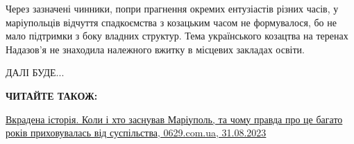 Через зазначені чинники, попри прагнення окремих ентузіастів різних часів, у
маріупольців відчуття спадкоємства з козацьким часом не формувалося, бо не мало
підтримки з боку владних структур. Тема українського козацтва на теренах
Надазов'я не знаходила належного вжитку в місцевих закладах освіти.

ДАЛІ БУДЕ...

\textbf{ЧИТАЙТЕ ТАКОЖ:}

\href{https://www.0629.com.ua/news/3653011/vkradena-istoria-koli-i-hto-zasnuvav-mariupol-ta-comu-pravda-pro-ce-bagato-rokiv-prihovuvalas-vid-suspilstva}{%
Вкрадена історія. Коли і хто заснував Маріуполь, та чому правда про це багато років приховувалась від суспільства, 0629.com.ua, 31.08.2023}
